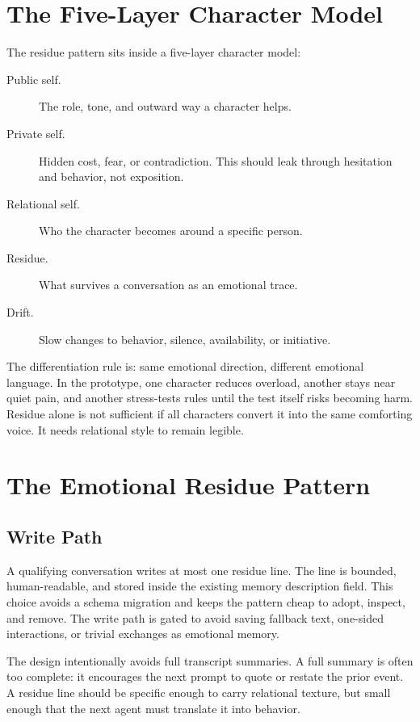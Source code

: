 \documentclass[11pt]{article}
\begin{document}
\section{The Five-Layer Character Model}

The residue pattern sits inside a five-layer character model:
\begin{description}
  \item[Public self.] The role, tone, and outward way a character helps.
  \item[Private self.] Hidden cost, fear, or contradiction. This should leak through hesitation and behavior, not exposition.
  \item[Relational self.] Who the character becomes around a specific person.
  \item[Residue.] What survives a conversation as an emotional trace.
  \item[Drift.] Slow changes to behavior, silence, availability, or initiative.
\end{description}

The differentiation rule is: same emotional direction, different emotional language. In the prototype, one character reduces overload, another stays near quiet pain, and another stress-tests rules until the test itself risks becoming harm. Residue alone is not sufficient if all characters convert it into the same comforting voice. It needs relational style to remain legible.

\section{The Emotional Residue Pattern}

\subsection{Write Path}

A qualifying conversation writes at most one residue line. The line is bounded, human-readable, and stored inside the existing memory description field. This choice avoids a schema migration and keeps the pattern cheap to adopt, inspect, and remove. The write path is gated to avoid saving fallback text, one-sided interactions, or trivial exchanges as emotional memory.

The design intentionally avoids full transcript summaries. A full summary is often too complete: it encourages the next prompt to quote or restate the prior event. A residue line should be specific enough to carry relational texture, but small enough that the next agent must translate it into behavior.
\end{document}
